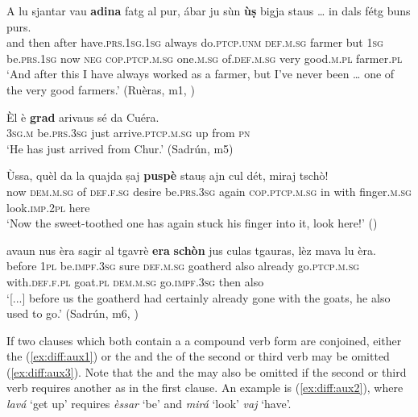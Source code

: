 \ea\label{ex:betgasynt2}
\gll    A lu sjantar vau \textbf{adina} fatg al pur, ábar ju sùn \textbf{ùṣ} bigja staus … in dals fétg buns purs.\\
and then after have.\textsc{prs.1sg.1sg} always do.\textsc{ptcp.unm} \textsc{def.m.sg} farmer but  \textsc{1sg} be.\textsc{prs.1sg} now \textsc{neg} \textsc{cop.ptcp.m.sg} {} one.\textsc{m.sg} of.\textsc{def.m.sg} very good.\textsc{m.pl} farmer.\textsc{pl}\\
\glt `And after this I have always worked as a farmer, but I’ve never been … one of the very good farmers.' (Ruèras, m1, )
\z

\ea
\label{ex:betgasynt3}
\gll Èl è \textbf{grad} arivaus sé da Cuéra.\\
\textsc{3sg.m} be.\textsc{prs.3sg} just arrive.\textsc{ptcp.m.sg} up from \textsc{pn}\\
\glt `He has just arrived from Chur.' (Sadrún, m5)
\z

\ea\label{ex:betgasynt4}
\gll Ùssa, quèl da la quajda ṣaj \textbf{puspè} stauṣ ajn cul dét, miraj tschò!\\
   now \textsc{dem.m.sg} of \textsc{def.f.sg} desire be.\textsc{prs.3sg} again \textsc{cop.ptcp.m.sg} in with finger.\textsc{m.sg} look.\textsc{imp.2pl} here\\
\glt `Now the sweet-toothed one has again stuck his finger into it, look here!' ()
\z

\ea
\label{ex:betgasynt5}
\gll    [...] avaun nus èra sagir al tgavrè \textbf{era} \textbf{schòn} jus culas tgauras, lèz mava lu èra.\\
{} before \textsc{1pl} be.\textsc{impf.3sg} sure \textsc{def.m.sg} goatherd also already go.\textsc{ptcp.m.sg} with.\textsc{def.f.pl} goat.\textsc{pl} \textsc{dem.m.sg} go.\textsc{impf.3sg} then also\\
\glt `[...] before us the goatherd had certainly already gone with the goats, he also used to go.' (Sadrún, m6, )
\z

If two clauses which both contain a a compound verb form are conjoined, either the  (\ref{ex:diff:aux1}) or the  and the  of the second or third verb may be omitted (\ref{ex:diff:aux3}). Note that the  and the  may also be omitted if the second or third verb requires another  as in the first clause. An example is (\ref{ex:diff:aux2}), where \textit{lavá} `get up' requires \textit{èssar} `be' and \textit{mirá} `look' \textit{vaj} `have'.

